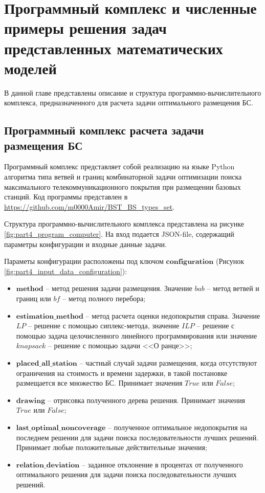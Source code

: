 \chapter{Программный комплекс и численные примеры решения задач представленных математических моделей}\label{part4}

В данной главе представлены описание и структура программно-вычислительного комплекса, предназначенного для расчета задачи оптимального размещения БС.

\section{Программный комплекс расчета задачи размещения БС}

Программный комплекс представляет собой реализацию на языке Python алгоритма типа ветвей и границ комбинаторной задачи оптимизации поиска максимального телекоммуникационного покрытия при размещении базовых станций. Код программы представлен в \url{https://github.com/m0000Amir/BST_BS_types_set}.

Структура программно-вычислительного комплекса представлена на рисунке \ref{fig:part4_program_computer}. На вход подается JSON-file, содержащий параметры конфигурации и входные данные задачи.

 Параметы конфигурации расположены под ключом $\textbf{configuration}$ (Рисунок \cref{fig:part4_input_data_configuration}):
 \begin{itemize}
   \item $\textbf{method}$ -- метод решения задачи размещения. Значение $\textit{bab}$ -- метод ветвей и границ или $\textit{bf}$  -- метод полного перебора;
   \item $\textbf{estimation\_method}$ -- метод расчета оценки недопокрытия справа. Значение $\textit{LP}$ -- решение с помощью сиплекс-метода, значение $\textit{ILP}$ -- решение с помощью задача целочисленного линейного программирования или значение $\textit{knapsack}$ -- решение с помощью задачи <<О ранце>>;
   \item $\textbf{placed\_all\_station}$ -- частный случай задачи размещения, когда отсутствуют ограничения на стоимость и времени задержки, в такой постановке размещается все множество БС. Принимает значения $\textit{True}$ или $\textit{False}$;
   \item $\textbf{drawing}$ -- отрисовка полученного дерева решения.  Принимает значения $\textit{True}$ или $\textit{False}$;
   \item $\textbf{last\_optimal\_noncoverage}$ -- полученное оптимальное недопокрытия на последнем решении  для задачи поиска последовательности лучших решений. Принимает любые положительные действительные значения;
   \item $\textbf{relation\_deviation}$ -- заданное отклонение в процентах от полученного оптимального решения для задачи поиска последовательности лучших решений.
 \end{itemize}



